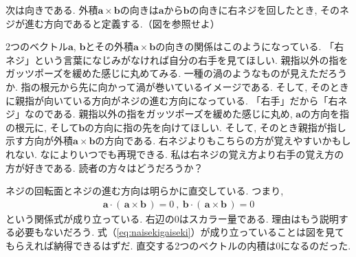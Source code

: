 次は向きである. 外積$\bm{a} \times \bm{b}$の向きは$\bm{a}$から$\bm{b}$の向きに右ネジを回したとき, 
そのネジが進む方向であると定義する.（図を参照せよ）
\begin{center}
\end{center}

2つのベクトル$\bm{a}$, $\bm{b}$とその外積$\bm{a} \times \bm{b}$の向きの関係はこのようになっている. 
「右ネジ」という言葉になじみがなければ自分の右手を見てほしい. 親指以外の指をガッツポーズを緩めた感じに丸めてみる. 
一種の渦のようなものが見えただろうか. 指の根元から先に向かって渦が巻いているイメージである. 
そして, そのときに親指が向いている方向がネジの進む方向になっている. 「右手」だから「右ネジ」なのである. 
親指以外の指をガッツポーズを緩めた感じに丸め, $\bm{a}$の方向を指の根元に, そして$\bm{b}$の方向に指の先を向けてほしい. 
そして, そのとき親指が指し示す方向が外積$\bm{a} \times \bm{b}$の方向である. 右ネジよりもこちらの方が覚えやすいかもしれない. 
なによりいつでも再現できる. 私は右ネジの覚え方より右手の覚え方の方が好きである. 読者の方々はどうだろうか？ 

ネジの回転面とネジの進む方向は明らかに直交している. つまり, 
\begin{eqnarray}
\bm{a} \cdot ( \, \bm{a} \times \bm{b} \, ) = 0 \: , \:  \bm{b} \cdot ( \, \bm{a} \times \bm{b} \, ) =0 
\label{eq:naisekigaiseki}
\end{eqnarray}
という関係式が成り立っている. 右辺の0はスカラー量である. 理由はもう説明する必要もないだろう. 
式（\ref{eq:naisekigaiseki}）が成り立っていることは図を見てもらえれば納得できるはずだ. 直交する2つのベクトルの内積は0になるのだった. 

